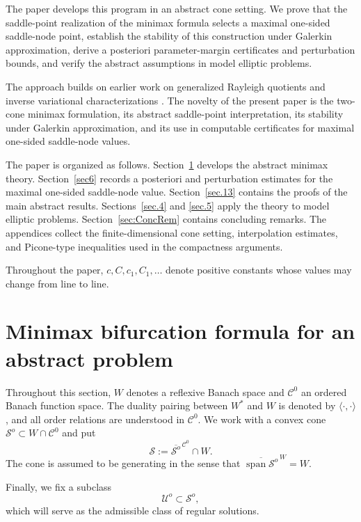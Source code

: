 \documentclass[preprint,10pt]{elsarticle}
\numberwithin{equation}{section}
\begin{document}
The paper develops this program in an abstract cone setting. We prove that the
saddle-point realization of the minimax formula selects a maximal one-sided
saddle-node point, establish the stability of this construction under
Galerkin approximation, derive a posteriori parameter-margin certificates and
perturbation bounds, and verify the abstract assumptions in model elliptic
problems.

The approach builds on earlier work on generalized Rayleigh quotients and
inverse variational characterizations
\cite{IlyasovCRAS,IlyasFunc,IvanIlya,IlIvan1,IlyasChaos,IlyasJDE24,
	IlyasovPOMI25,Salazar,ilyasELA}. The novelty of the present paper is the
two-cone minimax formulation, its abstract saddle-point interpretation, its
stability under Galerkin approximation, and its use in computable
certificates for maximal one-sided saddle-node values.

The paper is organized as follows. Section~\ref{sec.1} develops the abstract
minimax theory. Section~\ref{sec6} records a posteriori and perturbation
estimates for the maximal one-sided saddle-node value. Section~\ref{sec.13}
contains the proofs of the main abstract results. Sections~\ref{sec.4} and
\ref{sec.5} apply the theory to model elliptic problems.
Section~\ref{sec:ConcRem} contains concluding remarks. The appendices collect
the finite-dimensional cone setting, interpolation estimates, and
Picone-type inequalities used in the compactness arguments.

Throughout the paper, \(c,C,c_1,C_1,\ldots\) denote positive constants whose
values may change from line to line.








\section{Minimax bifurcation formula for an abstract problem}
\label{sec.1}

Throughout this section, \(W\) denotes a reflexive Banach space and
\(\mathcal C^0\) an ordered Banach function space. The duality pairing between
\(W^*\) and \(W\) is denoted by \(\langle\cdot,\cdot\rangle\), and all order
relations are understood in \(\mathcal C^0\). We work with a convex cone
\(\mathcal S^o\subset W\cap\mathcal C^0\) and put
\[
\mathcal S:=\overline{\mathcal S^o}^{\,\mathcal C^0}\cap W .
\]
The cone is assumed to be generating in the sense that
$
\overline{\operatorname{span}\mathcal S^o}^{\,W}=W .
$
\par \noindent
Finally, we fix a subclass 
\[\mathcal U^o\subset\mathcal S^o,\]
 which will
serve as the admissible class of regular solutions.
\end{document}

